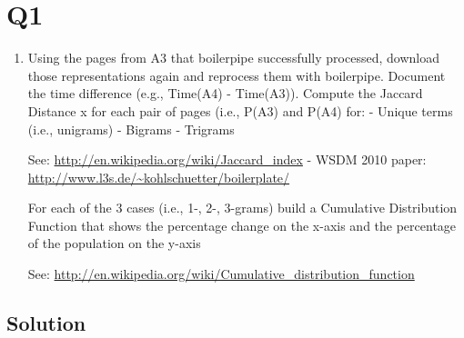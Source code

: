  


\section{Q1}
\label{part1}
\begin{enumerate}


\item Using the pages from A3 that boilerpipe successfully processed, download those representations again and reprocess them with boilerpipe.
 Document the time difference (e.g., Time(A4) - Time(A3)).
 Compute the Jaccard Distance x for each pair of pages (i.e., P(A3) and P(A4) for:
\subsubitem - Unique terms (i.e., unigrams)
\subsubitem - Bigrams
\subsubitem - Trigrams

 See:  \url{http://en.wikipedia.org/wiki/Jaccard_index}
- WSDM 2010 paper: \url{http://www.l3s.de/~kohlschuetter/boilerplate/}

 For each of the 3 cases (i.e., 1-, 2-, 3-grams) build a Cumulative Distribution Function that shows the percentage change on the x-axis and the percentage of the population on the y-axis

 See: \url{http://en.wikipedia.org/wiki/Cumulative_distribution_function}

\end{enumerate}

\subsection{Solution}

